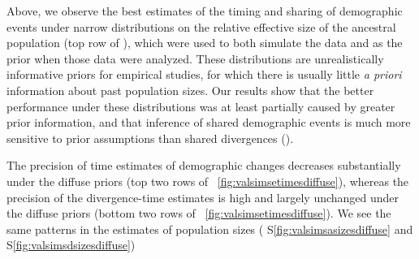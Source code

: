 Above, we observe the best estimates of the timing and sharing of demographic
events under narrow distributions on the relative effective size of the
ancestral population
(top row of \figs
{}),
which were used to both simulate the data and as the prior
when those data were analyzed.
These distributions are unrealistically informative priors for empirical
studies, for which there is usually little \emph{a priori} information about
past population sizes.
Our results show that the better performance under these distributions was at
least partially caused by greater prior information, and that
inference of shared demographic events is much more sensitive to
prior assumptions than shared divergences
(\figs {}).

The precision of time estimates of demographic changes decreases
substantially under the diffuse priors
(top two rows of \fig{}~\ref{fig:valsimsetimesdiffuse}),
whereas the precision of the divergence-time estimates
is high and largely unchanged under the diffuse priors
(bottom two rows of \fig{}~\ref{fig:valsimsetimesdiffuse}).
We see the same patterns in the estimates of population sizes
(\figs
S\ref{fig:valsimsasizesdiffuse}
and
S\ref{fig:valsimsdsizesdiffuse})

\ifembed{

}{}

